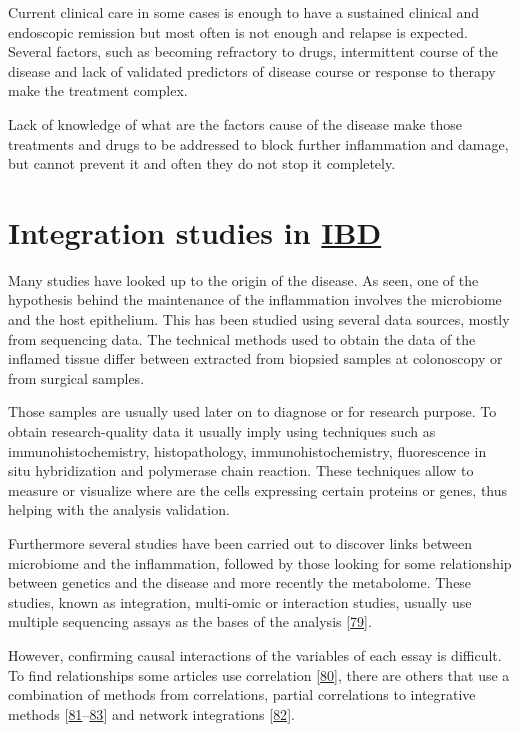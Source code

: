 \documentclass[
  12pt,
  a4paper,
  twoside,
  openright]{book}
\begin{document}
Current clinical care in some cases is enough to have a sustained clinical and endoscopic remission but most often is not enough and relapse is expected.
Several factors, such as becoming refractory to drugs, intermittent course of the disease and lack of validated predictors of disease course or response to therapy make the treatment complex.

Lack of knowledge of what are the factors cause of the disease make those treatments and drugs to be addressed to block further inflammation and damage, but cannot prevent it and often they do not stop it completely.

\hypertarget{integration-studies-in}{%
\section{\texorpdfstring{Integration studies in \protect\hyperlink{acronyms_IBD}{IBD}}{Integration studies in IBD}}\label{integration-studies-in}}

Many studies have looked up to the origin of the disease.
As seen, one of the hypothesis behind the maintenance of the inflammation involves the microbiome and the host epithelium.
This has been studied using several data sources, mostly from sequencing data.
The technical methods used to obtain the data of the inflamed tissue differ between extracted from biopsied samples at colonoscopy or from surgical samples.

Those samples are usually used later on to diagnose or for research purpose.
To obtain research-quality data it usually imply using techniques such as immunohistochemistry, histopathology, immunohistochemistry, fluorescence in situ hybridization and polymerase chain reaction.
These techniques allow to measure or visualize where are the cells expressing certain proteins or genes, thus helping with the analysis validation.

Furthermore several studies have been carried out to discover links between microbiome and the inflammation, followed by those looking for some relationship between genetics and the disease and more recently the metabolome.
These studies, known as integration, multi-omic or interaction studies, usually use multiple sequencing assays as the bases of the analysis {[}\protect\hyperlink{ref-beck2021}{79}{]}.

However, confirming causal interactions of the variables of each essay is difficult.
To find relationships some articles use correlation {[}\protect\hyperlink{ref-hasler_uncoupling_2016}{80}{]}, there are others that use a combination of methods from correlations, partial correlations to integrative methods {[}\protect\hyperlink{ref-tang2017}{81}--\protect\hyperlink{ref-huWholeExomeSequencing2021}{83}{]} and network integrations {[}\protect\hyperlink{ref-hernuxe1ndez-rocha2021}{82}{]}.
\end{document}
